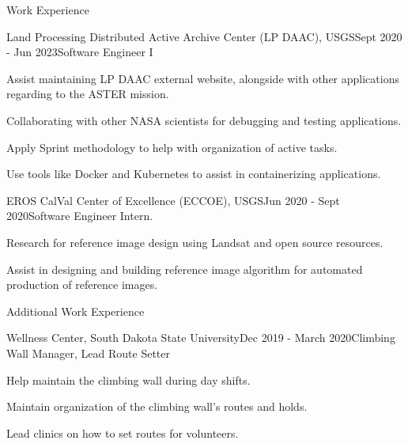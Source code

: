 \documentclass[11pt, a4paper]{resume}
\begin{document}
\begin{rSection}{Work Experience}
\begin{rSubsection}{Land Processing Distributed Active Archive Center (LP DAAC), USGS}{\normalfont Sept 2020 - Jun 2023}{Software Engineer I}{}
 \item {\normalfont Assist maintaining LP DAAC external website, alongside with other applications regarding to the ASTER mission.}
 \item {\normalfont Collaborating with other NASA scientists for debugging and testing applications.}
 \item {\normalfont Apply Sprint methodology to help with organization of active tasks.}
 \item {\normalfont Use tools like Docker and Kubernetes to assist in containerizing applications.}
\end{rSubsection}
\begin{rSubsection}{EROS CalVal Center of Excellence (ECCOE), USGS}{\normalfont Jun 2020 - Sept 2020}{Software Engineer Intern.}{}
 \item {\normalfont Research for reference image design using Landsat and open source resources.}
 \item {\normalfont Assist in designing and building reference image algorithm for automated production of reference images.}
\end{rSubsection}

\end{rSection}

\begin{rSection}{Additional Work Experience}
\begin{rSubsection}{Wellness Center, South Dakota State University}{\normalfont Dec 2019 - March 2020}{Climbing Wall Manager, Lead Route Setter}{}
  \item{\normalfont Help maintain the climbing wall during day shifts.}
  \item{\normalfont Maintain organization of the climbing wall's routes and holds.}
  \item{\normalfont Lead clinics on how to set routes for volunteers.}
\end{rSubsection}

\end{rSection}

\end{document}

